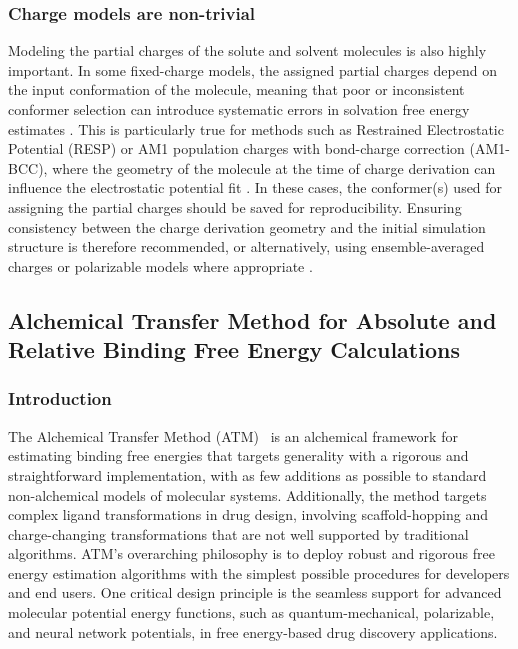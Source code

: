 \documentclass[9pt,bestpractices]{livecoms}
\begin{document}
\subsubsection{Charge models are non-trivial}
Modeling the partial charges of the solute and solvent molecules is also highly important. In some fixed-charge models, the assigned partial charges depend on the input conformation of the molecule, meaning that poor or inconsistent conformer selection can introduce systematic errors in solvation free energy estimates \cite{jakalian2000, jambeck2003}. This is particularly true for methods such as Restrained Electrostatic Potential (RESP)\cite{bayly1993resp} or AM1 population charges with bond-charge correction (AM1-BCC)\cite{jakalian2000}, where the geometry of the molecule at the time of charge derivation can influence the electrostatic potential fit \cite{basma2001, zhang2011, dupradeau2010, osato2025}. In these cases, the conformer(s) used for assigning the partial charges should be saved for reproducibility. Ensuring consistency between the charge derivation geometry and the initial simulation structure is therefore recommended, or alternatively, using ensemble-averaged charges or polarizable models where appropriate \cite{ren2002,lemkul2016}.

\subsection{Alchemical Transfer Method for Absolute and Relative Binding Free Energy Calculations}
\label{sec:atm}

\subsubsection{Introduction}
 
The Alchemical Transfer Method (ATM)~\cite{wu2021alchemical,azimi2022relative} is an alchemical framework for estimating binding free energies that targets generality with a rigorous and straightforward implementation, with as few additions as possible to standard non-alchemical models of molecular systems. Additionally, the method targets complex ligand transformations in drug design, involving scaffold-hopping and charge-changing transformations that are not well supported by traditional algorithms. ATM's overarching philosophy is to deploy robust and rigorous free energy estimation algorithms with the simplest possible procedures for developers and end users. One critical design principle is the seamless support for advanced molecular potential energy functions, such as quantum-mechanical, polarizable, and neural network potentials, in free energy-based drug discovery applications. 
\end{document}

